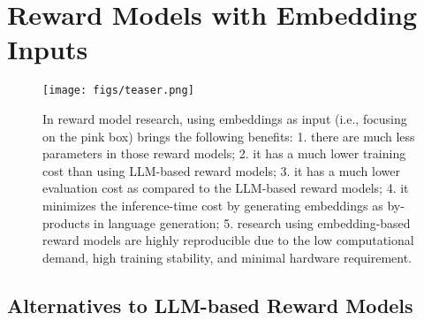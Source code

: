 \section{Reward Models with Embedding Inputs}
\label{sec:RM_from_embeddings}

\begin{figure}[h!]
    \texttt{[image: figs/teaser.png]}
    \vspace{-0.39cm}
    \caption{In reward model research, using embeddings as input (i.e., focusing on the pink box) brings the following benefits:
    1. there are much less parameters in those reward models;
    2. it has a much lower training cost than using LLM-based reward models;
    3. it has a much lower evaluation cost as compared to the LLM-based reward models; 
    4. it minimizes the inference-time cost by generating embeddings as by-products in language generation;
    5. research using embedding-based reward models are highly reproducible due to the low computational demand, high training stability, and minimal hardware requirement.}
    \label{fig:teaser}
\vspace{-0.3cm}
\end{figure}

\subsection{Alternatives to LLM-based Reward Models}


